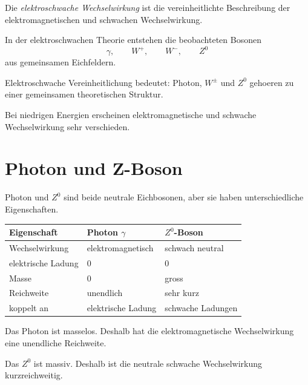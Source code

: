 \begin{definitionbox}
Die \emph{elektroschwache Wechselwirkung} ist die vereinheitlichte Beschreibung der
elektromagnetischen und schwachen Wechselwirkung.
\end{definitionbox}

\begin{conceptbox}
In der elektroschwachen Theorie entstehen die beobachteten Bosonen
\[
    \gamma,
    \qquad
    W^+,
    \qquad
    W^-,
    \qquad
    Z^0
\]
aus gemeinsamen Eichfeldern.
\end{conceptbox}

\begin{examtipbox}
Elektroschwache Vereinheitlichung bedeutet:
Photon, $W^\pm$ und $Z^0$ gehoeren zu einer gemeinsamen theoretischen Struktur.

Bei niedrigen Energien erscheinen elektromagnetische und schwache Wechselwirkung
sehr verschieden.
\end{examtipbox}

\section{Photon und Z-Boson}

Photon und $Z^0$ sind beide neutrale Eichbosonen, aber sie haben unterschiedliche
Eigenschaften.

\begin{center}
\begin{tabular}{|p{4.0cm}|p{4.5cm}|p{4.5cm}|}
\hline
Eigenschaft & Photon $\gamma$ & $Z^0$-Boson \\
\hline
Wechselwirkung & elektromagnetisch & schwach neutral \\
\hline
elektrische Ladung & $0$ & $0$ \\
\hline
Masse & $0$ & gross \\
\hline
Reichweite & unendlich & sehr kurz \\
\hline
koppelt an & elektrische Ladung & schwache Ladungen \\
\hline
\end{tabular}
\end{center}

\begin{conceptbox}
Das Photon ist masselos.
Deshalb hat die elektromagnetische Wechselwirkung eine unendliche Reichweite.

Das $Z^0$ ist massiv.
Deshalb ist die neutrale schwache Wechselwirkung kurzreichweitig.
\end{conceptbox}

